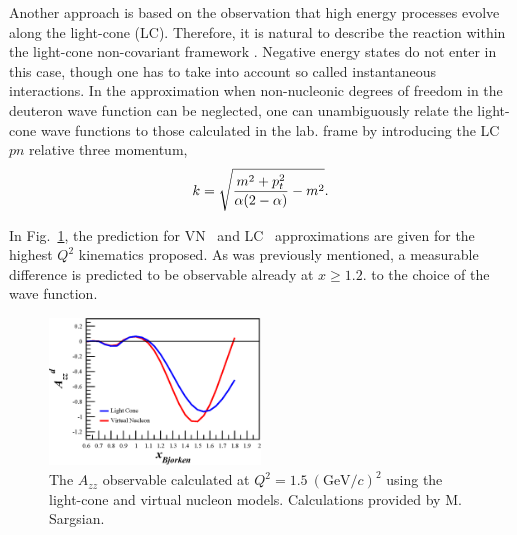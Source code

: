  Another approach is based on the observation that high energy processes
evolve along the light-cone (LC).  Therefore, it is natural to describe the 
reaction within the light-cone non-covariant framework \cite{Frankfurt:1981mk}. 
Negative energy states do not enter in this case, though one has to take into 
account so called instantaneous interactions.
In the approximation when non-nucleonic degrees of freedom in the
deuteron wave function can be neglected, one can unambiguously relate
the light-cone wave functions to those calculated in the lab. frame
by introducing the LC $pn$ relative three momentum,
\begin{equation}
k=\sqrt{{m^2+p_t^2\over \alpha(2-\alpha)} - m^2}.
\end{equation}

In Fig.~\ref{fig:misak}, the prediction for VN~\cite{Sargsian:2009hf} and LC~\cite{Frankfurt:1993sp} approximations are given 
for the highest $Q^2$ kinematics proposed. As was previously mentioned, a measurable 
difference is predicted to be observable already at $x\ge 1.2$.
to the choice of the wave function.  
 
 

\begin{figure}
\begin{center}
\includegraphics[width=0.50\textwidth]{figs/misak_vn_lc.eps}
\caption{\label{fig:misak} The $A_{zz}$ observable calculated at $Q^2=1.5~(\mathrm{GeV}/c)^2$ using the light-cone and virtual nucleon models. Calculations provided by M. Sargsian.}
\end{center}
\end{figure}

